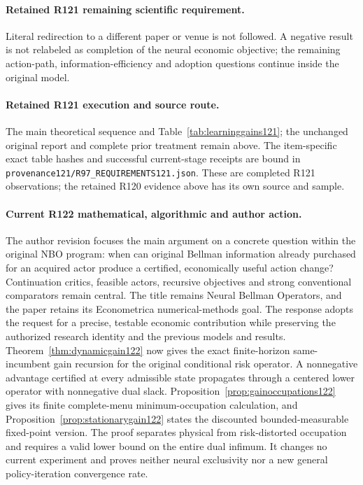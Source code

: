 \paragraph{Retained R121 remaining scientific requirement.}
Literal redirection to a different paper or venue is not followed. A negative result is not relabeled as completion of the neural economic objective; the remaining action-path, information-efficiency and adoption questions continue inside the original model.

\paragraph{Retained R121 execution and source route.}
The main theoretical sequence and Table~\ref{tab:learninggains121}; the unchanged original report and complete prior treatment remain above.
The item-specific exact table hashes and successful current-stage receipts are bound in \nolinkurl{provenance121/R97_REQUIREMENTS121.json}. These are completed R121 observations; the retained R120 evidence above has its own source and sample.
\paragraph{Current R122 mathematical, algorithmic and author action.}
The author revision focuses the main argument on a concrete question within the original NBO program: when can original Bellman information already purchased for an acquired actor produce a certified, economically useful action change? Continuation critics, feasible actors, recursive objectives and strong conventional comparators remain central. The title remains Neural Bellman Operators, and the paper retains its Econometrica numerical-methods goal. The response adopts the request for a precise, testable economic contribution while preserving the authorized research identity and the previous models and results. Theorem~\ref{thm:dynamicgain122} now gives the exact finite-horizon same-incumbent gain recursion for the original conditional risk operator. A nonnegative advantage certified at every admissible state propagates through a centered lower operator with nonnegative dual slack. Proposition~\ref{prop:gainoccupations122} gives its finite complete-menu minimum-occupation calculation, and Proposition~\ref{prop:stationarygain122} states the discounted bounded-measurable fixed-point version. The proof separates physical from risk-distorted occupation and requires a valid lower bound on the entire dual infimum. It changes no current experiment and proves neither neural exclusivity nor a new general policy-iteration convergence rate.
